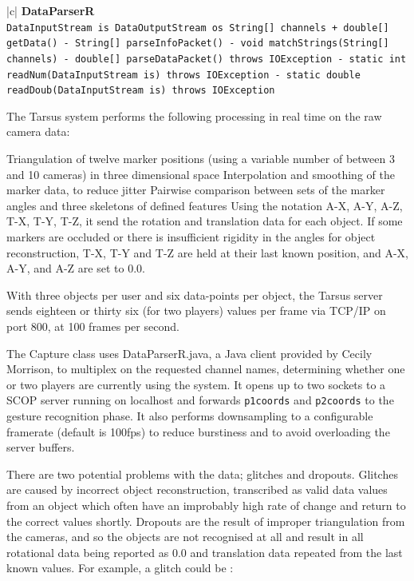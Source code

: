 \documentclass[12pt,a4,notitlepage]{report}
\renewcommand{\_}{\texttt{\symbol{95}}}
\newcommand{\<}{\texttt{\symbol{60}}}
\renewcommand{\>}{\texttt{\symbol{62}}}
\newcommand{\class}[1]{\textbf{#1}}
\newcommand{\scopendpoint}[1]{\texttt{#1}}
\newcommand{\variable}[1]{\texttt{#1}}
\begin{document}
{\begin{tabular}{|c|} \hline 
\class{DataParserR} \\ \hline
{}
{ \variable{DataInputStream is \newline
DataOutputStream os \newline
String[] channels \newline
+ double[] getData() \newline
- String[] parseInfoPacket() \newline
- void matchStrings(String[] channels) \newline
- double[] parseDataPacket() throws IOException \newline
- static int readNum(DataInputStream is) throws IOException \newline
- static double readDoub(DataInputStream is) throws IOException
} } \\ \hline
\end{tabular}

The Tarsus system performs the following processing in real time on the raw camera data:

Triangulation of twelve marker positions (using a variable number of between 3 and 10 cameras) in three dimensional space
Interpolation and smoothing of the marker data, to reduce jitter
Pairwise comparison between sets of the marker angles and three skeletons of defined features
Using the notation \<A-X, A-Y, A-Z, T-X, T-Y, T-Z\>, it send the rotation and translation data for each object. If some markers are occluded or there is insufficient rigidity in the angles for object reconstruction, T-X, T-Y and T-Z are held at their last known position, and A-X, A-Y, and A-Z are set to 0.0.

With three objects per user and six data-points per object, the Tarsus server sends eighteen or thirty six (for two players) values per frame via TCP/IP on port 800, at 100 frames per second.

The Capture class uses DataParserR.java, a Java client provided by Cecily Morrison, to multiplex on the requested channel names, determining whether one or two players are currently using the system. It opens up to two sockets to a SCOP server running on localhost and forwards \scopendpoint{p1coords} and \scopendpoint{p2coords} to the gesture recognition phase. It also performs downsampling to a configurable framerate (default is 100fps) to reduce burstiness and to avoid overloading the server buffers.

There are two potential problems with the data; glitches and dropouts. Glitches are caused by incorrect object reconstruction, transcribed as valid data values from an object which often have an improbably high rate of change and return to the correct values shortly. Dropouts are the result of improper triangulation from the cameras, and so the objects are not recognised at all and result in all rotational data being reported as 0.0 and translation data repeated from the last known values. For example, a glitch could be :

}
\end{document}
